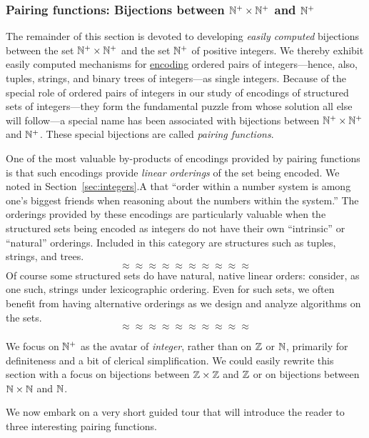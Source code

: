 \subsubsection{Pairing functions: Bijections between $\mathbb{N}^+ \times \mathbb{N}^+$ and $\mathbb{N}^+$}
\label{sec:building-pairing-functions}

The remainder of this section is devoted to developing {\em easily
  computed} bijections between the set $\mathbb{N}^+ \times \mathbb{N}^+$ and the set
$\mathbb{N}^+$ of positive integers.  We thereby exhibit easily computed
mechanisms for \underline{encoding} ordered pairs of integers---hence,
also, tuples, strings, and binary trees of integers---as single
integers.  Because of the special role of ordered pairs of integers in
our study of encodings of structured sets of integers---they form the
fundamental puzzle from whose solution all else will follow---a
special name has been associated with bijections between $\mathbb{N}^+ \times
\mathbb{N}^+$ and $\mathbb{N}^+$.  These special bijections are called {\it pairing
  functions}.  

One of the most valuable by-products of encodings provided by pairing
functions is that such encodings provide {\em linear orderings} of the
set being encoded.  We noted in Section~\ref{sec:integers}.A that
``order within a number system is among one's biggest friends when
reasoning about the numbers within the system.''  The orderings
provided by these encodings are particularly
valuable when the structured sets being encoded as integers do not
have their own ``intrinsic'' or ``natural'' orderings.  Included in
this category are  structures such as tuples,
strings, and trees.
\[ \approx \approx \approx \approx \approx \approx \approx \approx \approx \approx \]
Of course some structured sets do have natural, native linear orders:
consider, as one such, strings under lexicographic ordering.  Even for
such sets, we often benefit from having alternative orderings as we
design and analyze algorithms on the sets.
\[ \approx \approx \approx \approx \approx \approx \approx \approx \approx \approx \]

We focus on $\mathbb{N}^+$ as the avatar of {\it integer}, rather than on $\mathbb{Z}$
or $\mathbb{N}$, primarily for definiteness and a bit of clerical
simplification.  We could easily rewrite this section with a focus on
bijections between $\mathbb{Z} \times \mathbb{Z}$ and $\mathbb{Z}$ or on bijections between
$\mathbb{N} \times \mathbb{N}$ and $\mathbb{N}$.

\bigskip


We now embark on a very short guided tour that will introduce the
reader to three interesting pairing functions.

